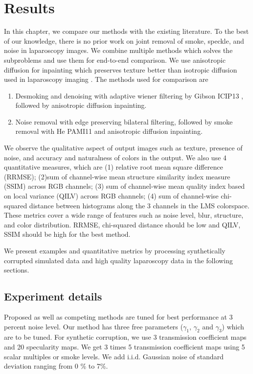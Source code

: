 \chapter{Results}

In this chapter, we compare our methods with the existing literature. To the best of our knowledge, there is no prior work on joint removal of smoke, speckle, and noise in laparoscopy images. We combine multiple methods which solves the subproblems and use them for end-to-end comparison. We use anisotropic diffusion for inpainting which preserves texture better than isotropic diffusion used in laparoscopy imaging \cite{saint2011detection, arnold2010speckle}. The methods used for comparison are
\begin{enumerate}
    \item Desmoking and denoising with adaptive wiener filtering by Gibson ICIP13 \cite{gibson2013wiener}, followed by anisotropic diffusion inpainting.
    \item Noise removal with edge preserving bilateral filtering, followed by smoke removal with He PAMI11 \cite{he2011dark} and anisotropic diffusion inpainting.
\end{enumerate}

We observe the qualitative aspect of output images such as texture, presence of noise, and accuracy and naturalness of colors in the output. We also use 4 quantitative measures, which are (1) relative root mean square difference (RRMSE); (2)sum of channel-wise mean structure similarity index measure (SSIM) across RGB channels; (3) sum of channel-wise mean quality index based on local variance (QILV) across RGB channels; (4) sum of channel-wise chi-squared distance between histograms along the 3 channels in the LMS colorspace. These metrics cover a wide range of features such as noise level, blur, structure, and color distribution. RRMSE, chi-squared distance should be low and QILV, SSIM should be high for the best method.

We present examples and quantitative metrics by processing synthetically corrupted simulated data and high quality laparoscopy data in the following sections.

\section{Experiment details}
Proposed as well as competing methods are tuned for best performance at 3 percent noise level. Our method has three free parameters ($\gamma_1$,  $\gamma_2$ and $\gamma_3$) which are to be tuned. For synthetic corruption, we use 3 transmission coefficient maps and 20 specularity maps. We get 3 times 5 transmission coefficient maps using 5 scalar multiples or smoke levels. We add i.i.d. Gaussian noise of standard deviation ranging from 0 \% to 7\%. 

